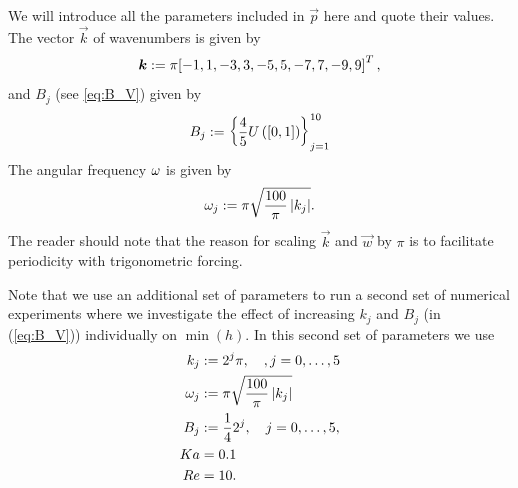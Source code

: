 \documentclass{amsart}
\theoremstyle{definition}
\theoremstyle{remark}
\numberwithin{equation}{section}
\begin{document}
We will introduce all the parameters included in $\vec{p}$ here and quote their values. The  vector $\vec k$ of wavenumbers is given by
\begin{equation}
\boldsymbol{k}:=\pi\!\left[{-1,1,-3,3,-5,5,-7,7,-9,9}\right]^T,
\end{equation}
and $B_j$ (see \ref{eq:B_V}) given by 
\begin{equation}
B_j:= \left\lbrace\frac{4}{5}U\left([0,1]\right)\right\rbrace_{j=1}^{10}
\end{equation}
The angular frequency $\omega$ is given by 
\begin{equation}
\omega_j :=\pi \sqrt{\frac{100}{\pi}\left|k_j\right|}.
\end{equation}
The reader should note that the reason for scaling $\vec{k}$ and $\vec{w}$ by $\pi$ is to  facilitate  periodicity with trigonometric forcing.
\begin{Rem} Note that we use an additional  set of parameters to run a second set of numerical experiments where we investigate the effect of increasing $k_j$ and $B_j$ (in (\ref{eq:B_V})) individually on $\min(h)$.  In this second set of parameters we use
	\begin{equation}\label{eq:second_parameter_set}
\begin{aligned}
{k}_j&:=2^j\pi,\quad, j=0,\dots,5\\
\omega_j &:=\pi \sqrt{\frac{100}{\pi}\left|k_j\right|}\\
B_j&:=\frac{1}{4}2^j,\quad j = 0,\dots,5,\\
Ka&=0.1\\
Re&=10.
\end{aligned}
	\end{equation}
\end{Rem}
\end{document}
